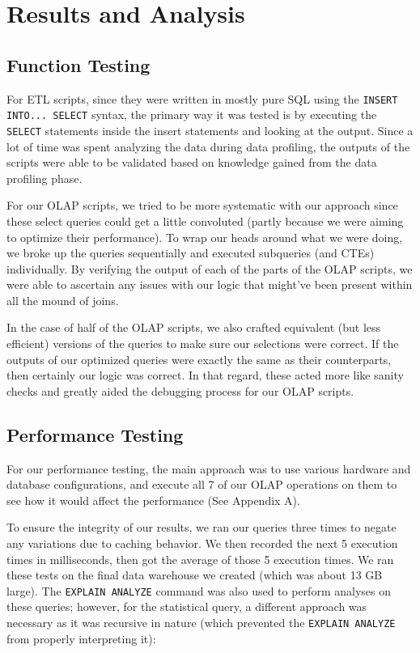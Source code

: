 \section{Results and Analysis}

\subsection{Function Testing}

For ETL scripts, since they were written in mostly pure SQL using the \verb|INSERT INTO... SELECT| syntax, the primary way it was tested is by executing the \verb|SELECT| statements inside the insert statements and looking at the output. Since a lot of time was spent analyzing the data during data profiling, the outputs of the scripts were able to be validated based on knowledge gained from the data profiling phase.

For our OLAP scripts, we tried to be more systematic with our approach since these select queries could get a little convoluted (partly because we were aiming to optimize their performance). To wrap our heads around what we were doing, we broke up the queries sequentially and executed subqueries (and CTEs) individually. By verifying the output of each of the parts of the OLAP scripts, we were able to ascertain any issues with our logic that might've been present within all the mound of joins.

In the case of half of the OLAP scripts, we also crafted equivalent (but less efficient) versions of the queries to make sure our selections were correct. If the outputs of our optimized queries were exactly the same as their counterparts, then certainly our logic was correct. In that regard, these acted more like sanity checks and greatly aided the debugging process for our OLAP scripts.


\subsection{Performance Testing}

For our performance testing, the main approach was to use various hardware and database configurations, and execute all 7 of our OLAP operations on them to see how it would affect the performance (See Appendix A).

To ensure the integrity of our results, we ran our queries three times to negate any variations due to caching behavior. We then recorded the next 5 execution times in milliseconds, then got the average of those 5 execution times. We ran these tests on the final data warehouse we created (which was about 13 GB large). The \verb|EXPLAIN ANALYZE| command was also used to perform analyses on these queries; however, for the statistical query, a different approach was necessary as it was recursive in nature (which prevented the \verb|EXPLAIN ANALYZE| from properly interpreting it):

